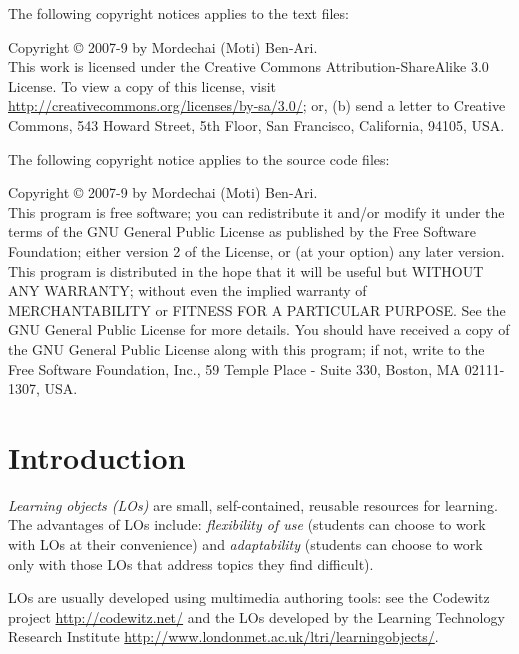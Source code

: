 \maketitle
\thispagestyle{empty}

\vfill

The following copyright notices applies to the text files:

Copyright \copyright{} 2007-9 by Mordechai (Moti) Ben-Ari.\\
This work is licensed under the Creative Commons Attribution-ShareAlike 3.0
License. To view a copy of this license, visit
\url{http://creativecommons.org/licenses/by-sa/3.0/}; or, (b) send a letter
to Creative Commons, 543 Howard Street, 5th Floor, San Francisco,
California, 94105, USA.

The following copyright notice applies to the source code files:

Copyright \copyright{} 2007-9 by Mordechai (Moti) Ben-Ari.\\
This program is free software; you can redistribute it and/or
modify it under the terms of the GNU General Public License
as published by the Free Software Foundation; either version 2
of the License, or (at your option) any later version.
This program is distributed in the hope that it will be useful
but WITHOUT ANY WARRANTY; without even the implied warranty of
MERCHANTABILITY or FITNESS FOR A PARTICULAR PURPOSE.
See the GNU General Public License for more details.
You should have received a copy of the GNU General Public License
along with this program; if not, write to the Free Software
Foundation, Inc., 59 Temple Place - Suite 330, Boston, MA
02111-1307, USA.

\clearpage

\section*{Introduction}
\emph{Learning objects (LOs)} are small, self-contained, reusable resources for 
learning. The advantages of LOs include: \emph{flexibility of 
use} (students can choose to work with LOs at their convenience) and 
\emph{adaptability} (students can choose to work only with those LOs that 
address topics they find difficult).

LOs are usually developed using multimedia authoring tools: see
the Codewitz project \url{http://codewitz.net/} and the LOs
developed by the Learning Technology Research Institute 
\url{http://www.londonmet.ac.uk/ltri/learningobjects/}.

